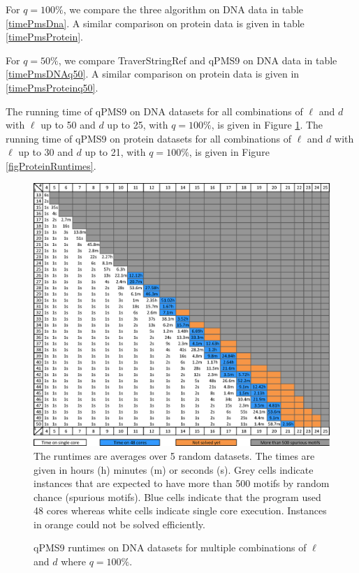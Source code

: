 For $q=100\%$, we compare the three algorithm on DNA data 
in table \ref{timePmsDna}. A similar comparison on protein data is given in
table \ref{timePmsProtein}.

For $q=50\%$, we compare TraverStringRef and
qPMS9 on DNA data in table \ref{timePmsDNAq50}. A similar comparison on protein
data is given in \ref{timePmsProteinq50}.

The running time of qPMS9 on DNA datasets for all combinations of $\ell$ and $d$
with $\ell$ up to 50 and $d$ up to 25, with $q=100\%$, is given in Figure
\ref{figDnaRuntimes}. The running time of qPMS9 on
protein datasets for all combinations of $\ell$ and $d$ with $\ell$ up to 30 and
$d$ up to 21, with $q=100\%$, is given in Figure \ref{figProteinRuntimes}.

\begin{figure}
    \caption{qPMS9 runtimes on DNA datasets for multiple combinations of $\ell$
    and $d$ where $q=100\%$. 
    \label{figDnaRuntimes}}
    \includegraphics[width=1.0\textwidth]{qpms9-dna-runtimes}
    The runtimes are averages over 5 random datasets. The
    times are given in hours (h) minutes (m) or seconds (s). Grey cells indicate instances that
    are expected to have more than 500 motifs by random chance (spurious
    motifs). Blue cells indicate that the program used 48 cores whereas white
    cells indicate single core execution. Instances in orange could not be
    solved efficiently.
\end{figure}

